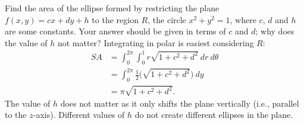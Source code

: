 {Find the area of the ellipse formed by restricting the plane $f(x,y) = cx+dy+h$ to the region $R$, the circle $x^2+y^2=1$, where $c$, $d$ and $h$ are some constants. Your answer should be given in terms of $c$ and $d$; why does the value of $h$ not matter?
}
{Integrating in polar is easiest considering $R$:
\begin{align*}SA &= \int_{0}^{2\pi}\int_{0}^{1} r\sqrt{1+ c^2+d^2}\ dr\ d\theta\\
		&= \int_0^{2\pi}\frac12\Big(\sqrt{1+c^2+d^2}\Big)\ dy \\
		&= \pi\sqrt{1+c^2+d^2}.
\end{align*}
The value of $h$ does not matter as it only shifts the plane vertically (i.e., parallel to the $z$-axis). Different values of $h$ do not create different ellipses in the plane.
}